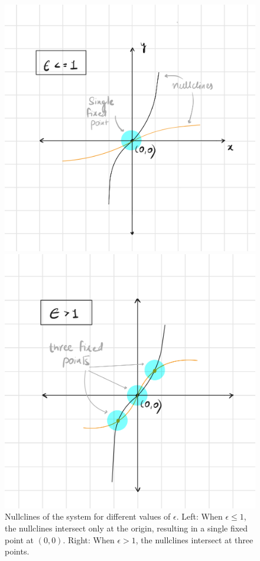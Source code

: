 \documentclass[12pt]{article}
\begin{document}
\begin{figure}[h!]
    \centering
    \begin{minipage}{0.48\textwidth}
        \centering
        \includegraphics[width=\textwidth]{figures/q3_sketch_2.jpeg}
    \end{minipage}
    \begin{minipage}{0.48\textwidth}
        \centering
        \includegraphics[width=\textwidth]{figures/q3_sketch_1.jpeg}
    \end{minipage}
    \caption{\centering Nullclines of the system for different values of $\epsilon$. Left: When $\epsilon \leq 1$, the nullclines intersect only at the origin, resulting in a single fixed point at $(0,0)$. Right: When $\epsilon > 1$, the nullclines intersect at three points.}
\end{figure}
\end{document}
